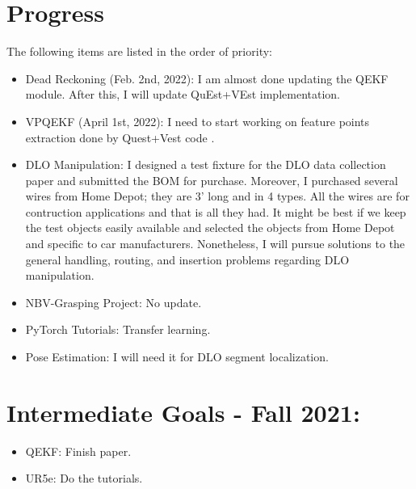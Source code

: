 \documentclass[11pt]{article}
\begin{document}
\section{Progress}
The following items are listed in the order of priority:
\begin{itemize}
      \item Dead Reckoning (Feb. 2nd, 2022): I am almost done updating the QEKF
      module. After this, I will update QuEst+VEst implementation.
      \item VPQEKF (April 1st, 2022): I need to start working on feature points
      extraction done by Quest+Vest code \cite{quest}.
      \item DLO Manipulation: I designed a test fixture for the DLO data
      collection paper and submitted the BOM for purchase. Moreover, I purchased
      several wires from Home Depot; they are 3' long and in 4 types. All the
      wires are for contruction applications and that is all they had. It might
      be best if we keep the test objects easily available and selected the
      objects from Home Depot and specific to car manufacturers. Nonetheless,
      I will pursue solutions to the general handling, routing, and insertion
      problems regarding DLO manipulation.
      \item NBV-Grasping Project: No update.
      \item PyTorch Tutorials: Transfer learning.
      \item Pose Estimation: I will need it for DLO segment localization.
\end{itemize}


\section{Intermediate Goals - Fall 2021:}
\begin{itemize}
      \item QEKF: Finish paper.
      \item UR5e: Do the tutorials.
\end{itemize}


\newpage


\end{document}
